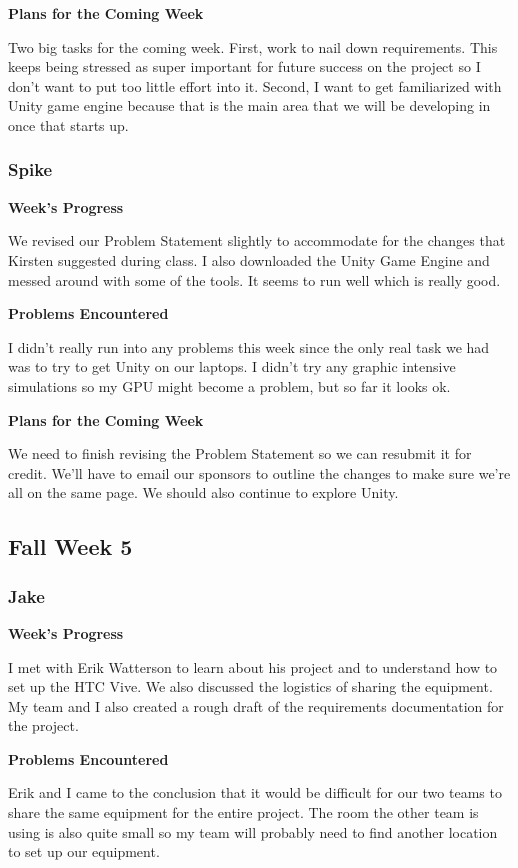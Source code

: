 \documentclass[10pt,journal,compsoc,onecolumn, draftclsnofoot]{IEEEtran}
\begin{document}
\noindent \textbf{Plans for the Coming Week}

Two big tasks for the coming week.  First, work to nail down requirements.  This keeps being stressed as super important for future success on the project so I don't want to put too little effort into it.  Second, I want to get familiarized with Unity game engine because that is the main area that we will be developing in once that starts up.

\subsubsection{Spike}
\noindent \textbf{Week's Progress}

We revised our Problem Statement slightly to accommodate for the changes that Kirsten suggested during class. I also downloaded the Unity Game Engine and messed around with some of the tools. It seems to run well which is really good.

\noindent \textbf{Problems Encountered}

I didn't really run into any problems this week since the only real task we had was to try to get Unity on our laptops. I didn't try any graphic intensive simulations so my GPU might become a problem, but so far it looks ok.

\noindent \textbf{Plans for the Coming Week}

We need to finish revising the Problem Statement so we can resubmit it for credit. We'll have to email our sponsors to outline the changes to make sure we're all on the same page. We should also continue to explore Unity.

\subsection{Fall Week 5}
\subsubsection{Jake}
\noindent \textbf{Week's Progress}

I met with Erik Watterson to learn about his project and to understand how to set up the HTC Vive. We also discussed the logistics of sharing the equipment. My team and I also created a rough draft of the requirements documentation for the project.

\noindent \textbf{Problems Encountered}

Erik and I came to the conclusion that it would be difficult for our two teams to share the same equipment for the entire project. The room the other team is using is also quite small so my team will probably need to find another location to set up our equipment.
\end{document}
